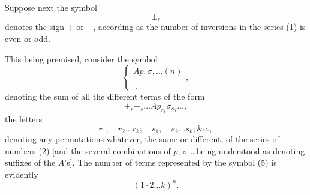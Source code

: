 \documentclass[11pt,a4paper]{book}
\begin{document}
Suppose next the symbol
\[
\pm_r
\]
denotes the sign $+$ or $-$, according as the number of inversions in the series (1) is
even or odd.

This being premised, consider the symbol
\[
\left\{\begin{array}{c}
Ap, \sigma, \ldots (n) \\
\left[\begin{array}{c}
\\
\end{array}\right.
\end{array}\right.
\tag{4},
\]
denoting the sum of all the different terms of the form
\[
\pm_r \pm_s \ldots Ap_{r_1}\sigma_{s_1} \ldots
\tag{5},
\]
the letters
\[
r_1, \quad r_2 \ldots r_k; \quad s_1, \quad s_2 \ldots s_k; \&\text{c.}
\tag{6},
\]
denoting any permutations whatever, the same or different, of the series of numbers
(2) [and the several combinations of $p$, $\sigma$ \ldots being understood as denoting suffixes of
the $A$'s]. The number of terms represented by the symbol (5) is evidently
\[
(1 \cdot 2 \ldots k)^n
\tag{7}.
\]
\end{document}
